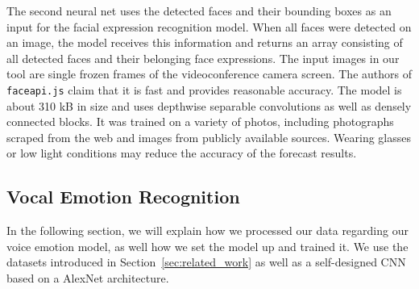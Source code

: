 The second neural net uses the detected faces and their bounding boxes as an input for the facial expression recognition model. When all faces were detected on an image, the model receives this information and returns an array consisting of all detected faces and their belonging face expressions. The input images in our tool are single frozen frames of the videoconference camera screen. The authors of \texttt{faceapi.js} claim that it is fast and provides reasonable accuracy. The model is about 310 kB in size and uses depthwise separable convolutions as well as densely connected blocks. It was trained on a variety of photos, including photographs scraped from the web and images from publicly available sources. Wearing glasses or low light conditions may reduce the accuracy of the forecast results.


\subsection{Vocal Emotion Recognition}
\label{subsec:method_vocal_emotion_recognition}
In the following section, we will explain how we processed our data regarding our voice emotion model, as well how we set the model up and trained it. We use the datasets introduced in Section~\ref{sec:related_work} as well as a self-designed CNN based on a AlexNet architecture.

